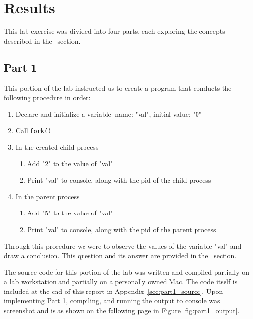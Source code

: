 
\section{Results}\label{sec:results}
    This lab exercise was divided into four parts, each exploring the concepts described in the~ section.



    \subsection{Part 1}\label{subsec:part1}
        This portion of the lab instructed us to create a program that conducts the following procedure in order:

        \begin{enumerate}
            \itemsep0em
            \item Declare and initialize a variable, name: "val", initial value: "0"
            \item Call \texttt{fork()}
            \item In the created child process
            \begin{enumerate}
                \itemsep0em
                \item Add "2" to the value of "val"
                \item Print "val" to console, along with the pid of the child process
            \end{enumerate}
            \item In the parent process
            \begin{enumerate}
                \itemsep0em
                \item Add "5" to the value of "val"
                \item Print "val" to console, along with the pid of the parent process
            \end{enumerate}
        \end{enumerate}
        Through this procedure we were to observe the values of the variable "val" and draw a conclusion.
        This question and its answer are provided in the~ section.

        \medskip
        \noindent The source code for this portion of the lab was written and compiled partially on a lab workstation and partially on a personally owned Mac.
        The code itself is included at the end of this report in Appendix~\ref{sec:part1_source}.
        Upon implementing Part 1, compiling, and running the output to console was screenshot and is as shown on the following page in Figure \ref{fig:part1_output}.

